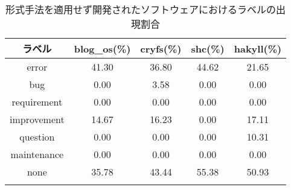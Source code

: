\begin{table}[p] %
	\centering
	\caption{形式手法を適用せず開発されたソフトウェアにおけるラベルの出現割合}
	\label{tab:discussion_common}
	\begin{tabular}{ccccc} %
		\Hline
		ラベル      & blog\_os(\%) & cryfs(\%) & shc(\%) & hakyll(\%) \\\hline
		error       & 41.30        & 36.80     & 44.62   & 21.65      \\
		bug         & 0.00         & 3.58      & 0.00    & 0.00       \\
		requirement & 0.00         & 0.00      & 0.00    & 0.00       \\
		improvement & 14.67        & 16.23     & 0.00    & 17.11      \\
		question    & 0.00         & 0.00      & 0.00    & 10.31      \\
		maintenance & 0.00         & 0.00      & 0.00    & 0.00       \\
		none        & 35.78        & 43.44     & 55.38   & 50.93      \\\Hline
	\end{tabular}
\end{table}


